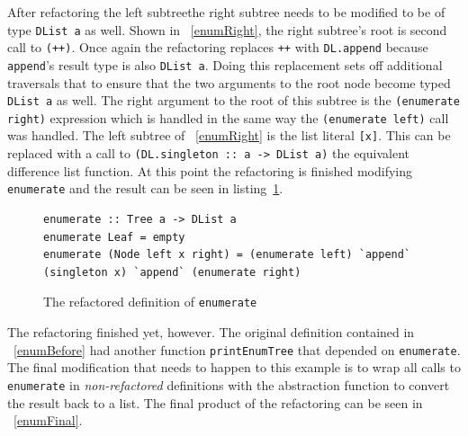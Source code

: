 After refactoring the left subtree\DIFaddbegin \DIFadd{, }\DIFaddend the right subtree needs to be modified to be of type \texttt{DList a} as well. Shown in \DIFdelbegin {}\DIFdelend \DIFaddbegin {}\DIFaddend ~\ref{enumRight}, the right subtree's root is \DIFdelbegin {}\DIFdelend \DIFaddbegin {}\DIFaddend second call to \texttt{(++)}. Once again the refactoring replaces \texttt{++} with \texttt{DL.append} because \texttt{append}'s result type is also \texttt{DList a}. Doing this replacement sets off additional traversals that \DIFdelbegin {}\DIFdelend \DIFaddbegin {}\DIFaddend to ensure that the two arguments to the root node become typed \texttt{DList a} as well. \DIFaddbegin {}\texttt{}\texttt{}\DIFaddend The right argument to the root of this subtree is the \texttt{(enumerate right)} expression which is handled in the same way the \texttt{(enumerate left)} call was handled. The left subtree of \DIFdelbegin {}\DIFdelend \DIFaddbegin {}\DIFaddend ~\ref{enumRight}  is the list literal \texttt{[x]}. This can be replaced with a call to \texttt{(DL.singleton :: a -> DList a)} the equivalent difference list function. At this point the refactoring is finished modifying \DIFaddbegin {}\DIFaddend \texttt{enumerate} and the result can be seen in listing~\ref{enumRef}.

\begin{figure}[t]
\begin{lstlisting}
enumerate :: Tree a -> DList a
enumerate Leaf = empty
enumerate (Node left x right) = (enumerate left) `append` (singleton x) `append` (enumerate right)
\end{lstlisting}
\caption{The refactored definition of \texttt{enumerate}}
\label{enumRef}
\end{figure}

The refactoring \DIFdelbegin {}\DIFdelend \DIFaddbegin {}\DIFaddend finished yet, however. The original definition contained in \DIFdelbegin {}\DIFdelend \DIFaddbegin {}\DIFaddend ~\ref{enumBefore} had another function \texttt{printEnumTree} that depended on \texttt{enumerate}. The final modification that needs to happen to this example is to wrap all calls to \texttt{enumerate} in \textit{non-refactored} definitions with the abstraction function to convert the result back to a list. The final product of the refactoring can be seen in \DIFdelbegin {}\DIFdelend \DIFaddbegin {}\DIFaddend ~\ref{enumFinal}.


